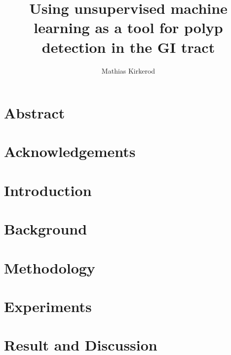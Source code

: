 \documentclass[a4paper,english]{ifimaster}
\title{Using unsupervised machine learning as a tool for polyp detection in the GI tract}
\author{Mathias Kirkerod}
\begin{document}
\duoforside[dept={Department of Informatics},program={Informatics: Technical and Scientific Applications},long]

\frontmatter{}
\chapter*{Abstract}


\chapter*{Acknowledgements}


\tableofcontents{}
\listoffigures{}
\listoftables{}


\mainmatter{}

\chapter{Introduction} \label{cap:introduction}


\chapter{Background} \label{cap:background}



\chapter{Methodology}\label{cap:methodology}



%

\chapter{Experiments} \label{cap:experiments}



\chapter{Result and Discussion} \label{cap:results}

\end{document}
